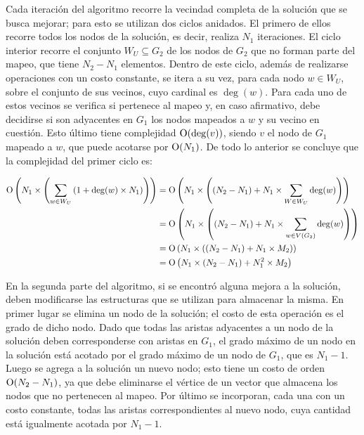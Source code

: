 
Cada iteración del algoritmo recorre la vecindad completa de la solución que
se busca mejorar; para esto se utilizan dos ciclos anidados. El primero de
ellos recorre todos los nodos de la solución, es decir, realiza $N_1$
iteraciones. El ciclo interior recorre el conjunto $W_U \subseteq G_2$ de los
nodos de $G_2$ que no forman parte del mapeo, que tiene $N_2 - N_1$ elementos.
Dentro de este ciclo, además de realizarse operaciones con un costo constante,
se itera a su vez, para cada nodo $w \in W_U$, sobre el conjunto de sus
vecinos, cuyo cardinal es $\deg(w)$. Para cada uno de estos vecinos se
verifica si pertenece al mapeo y, en caso afirmativo, debe decidirse si son
adyacentes en $G_1$ los nodos mapeados a $w$ y su vecino en cuestión. Esto
último tiene complejidad $\operatorname{O}(\deg(v))$, siendo $v$ el nodo de $G_1$
mapeado a $w$, que puede acotarse por $\operatorname{O}(N_1)$. De todo lo anterior se
concluye que la complejidad del primer ciclo es:

\begin{align*}
\operatorname{O}\left( N_1 \times \left( \sum_{w \in W_U} \left(1 + \deg(w) \times N_1
\right) \right) \right)
&= \operatorname{O} \left( N_1 \times \left( (N_2 - N_1) + N_1 \times \sum_{W \in W_U}
\deg(w) \right) \right) \\
&= \operatorname{O} \left( N_1 \times \left( (N_2 - N_1) + N_1 \times \sum_{w \in V(G_2)}
\deg(w) \right) \right) \\
&= \operatorname{O} \left( N_1 \times \left( (N_2 - N_1) + N_1 \times M_2 \right) \right) \\
&= \operatorname{O} \left( N_1 \times (N_2 - N_1) + N_1^2 \times M_2 \right)
\end{align*}

En la segunda parte del algoritmo, si se encontró alguna mejora a la solución,
deben modificarse las estructuras que se utilizan para almacenar la misma. En
primer lugar se elimina un nodo de la solución; el costo de esta operación es
el grado de dicho nodo. Dado que todas las aristas adyacentes a un nodo de la
solución deben corresponderse con aristas en $G_1$, el grado máximo de un nodo
en la solución está acotado por el grado máximo de un nodo de $G_1$, que es
$N_1 - 1$. Luego se agrega a la solución un nuevo nodo; esto tiene un costo de
orden $\operatorname{O}(N_2 - N_1)$, ya que debe eliminarse el vértice de un vector que
almacena los nodos que no pertenecen al mapeo. Por último se incorporan, cada
una con un costo constante, todas las aristas correspondientes al nuevo nodo,
cuya cantidad está igualmente acotada por $N_1 - 1$.

